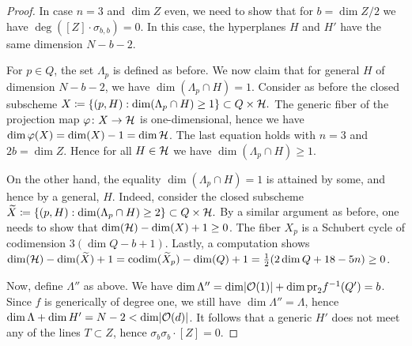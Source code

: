 \begin{proof}
	In case $n=3$ and $\dim Z$ even, we need to show that for $b=\dim Z/2$ we have
	$\deg ([Z]\cdot \sigma_{b,b})=0$. In this case, the hyperplanes $H$ and $H'$ have the same dimension $N-b-2$.

	For $p\in Q$, the set $\Lambda_p$ is defined as before. We now claim that for general $H$ of dimension $N-b-2$, we have
	$\dim(\Lambda_p\cap H)=1$. Consider as before the closed subscheme
	$
		X\coloneqq \{(p,H) : \dim(\Lambda_p\cap H)\geq 1\}
		\subset Q\times \mathcal{H}.
	$
	The generic fiber of the projection map $\varphi\colon X\to \mathcal{H}$ is one-dimensional, hence we have
	$\dim \varphi(X) = \dim(X)-1 = \dim \mathcal{H}$. The last equation holds with $n=3$ and $2b=\dim Z$. Hence for all $H\in \mathcal{H}$ we have $\dim (\Lambda_p \cap H)\geq 1$.

	On the other hand, the equality $\dim(\Lambda_p \cap H)=1$ is attained by some, and hence by a general, $H$. Indeed, consider the closed subscheme
	$
		\widetilde X \coloneqq \{(p,H) : \dim(\Lambda_p\cap H)\geq 2\}
		\subset Q\times \mathcal{H}.
	$
	By a similar argument as before, one needs to show that
	$\dim(\mathcal{H})-\dim(X) + 1\geq 0$. The fiber $X_p$ is a Schubert cycle of codimension
	$3(\dim Q-b+1)$. Lastly, a computation shows
	$\dim(\mathcal{H})-\dim(\widetilde X)+1=\operatorname{codim}(\widetilde X_p)-\dim(Q)+1=\frac{1}{2}(2\dim Q + 18 - 5n)\geq 0$.

	Now, define $\Lambda''$ as above. We have
	$\dim \Lambda''
	= \dim \lvert\mathcal{O}(1)\rvert + \dim \mathrm{pr}_2 f^{-1}(Q')
	= b$.
	Since $f$ is generically of degree one, we still have $\dim \Lambda'' = \Lambda$, hence $\dim \Lambda + \dim H' = N-2 < \dim \lvert\mathcal{O}(d)\rvert$. It follows that a generic $H'$ does not meet any of the lines $T\subset Z$, hence $\sigma_{b}\sigma_{b}\cdot [Z] = 0$.

\end{proof}